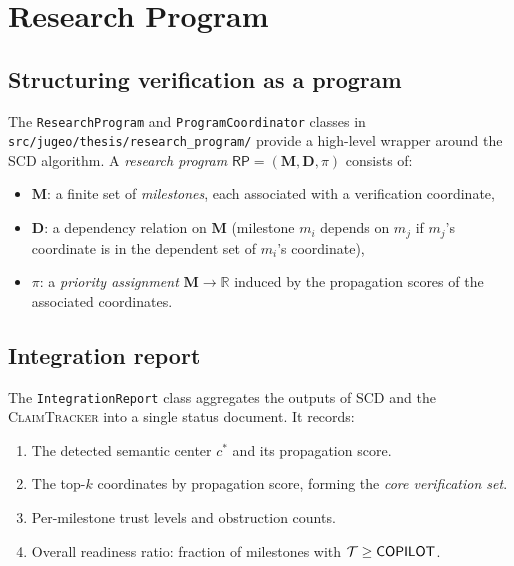 \documentclass[11pt]{article}
\newcommand{\SCD}{\textsc{SCD}}             %
\newcommand{\TCT}{\textsc{ClaimTracker}}    %
\newcommand{\RP}{\mathsf{RP}}               %
\begin{document}
\section{Research Program}\label{sec:research}

\subsection{Structuring verification as a program}

The \texttt{ResearchProgram} and \texttt{ProgramCoordinator} classes
in \texttt{src/jugeo/thesis/research\_program/} provide a high-level
wrapper around the \SCD{} algorithm.  A \emph{research program}
$\RP = (\mathbf{M}, \mathbf{D}, \pi)$ consists of:
\begin{itemize}[noitemsep]
  \item $\mathbf{M}$: a finite set of \emph{milestones}, each
        associated with a verification coordinate,
  \item $\mathbf{D}$: a dependency relation on $\mathbf{M}$
        (milestone $m_i$ depends on $m_j$ if $m_j$'s coordinate
        is in the dependent set of $m_i$'s coordinate),
  \item $\pi$: a \emph{priority assignment} $\mathbf{M} \to \mathbb{R}$
        induced by the propagation scores of the associated coordinates.
\end{itemize}

\subsection{Integration report}

The \texttt{IntegrationReport} class aggregates the outputs of \SCD{}
and the \TCT{} into a single status document.  It records:
\begin{enumerate}[noitemsep,label=(\arabic*)]
  \item The detected semantic center $c^*$ and its propagation score.
  \item The top-$k$ coordinates by propagation score, forming the
        \emph{core verification set}.
  \item Per-milestone trust levels and obstruction counts.
  \item Overall readiness ratio: fraction of milestones with
        $\mathcal{T} \geq \mathsf{COPILOT}$.
\end{enumerate}
\end{document}
